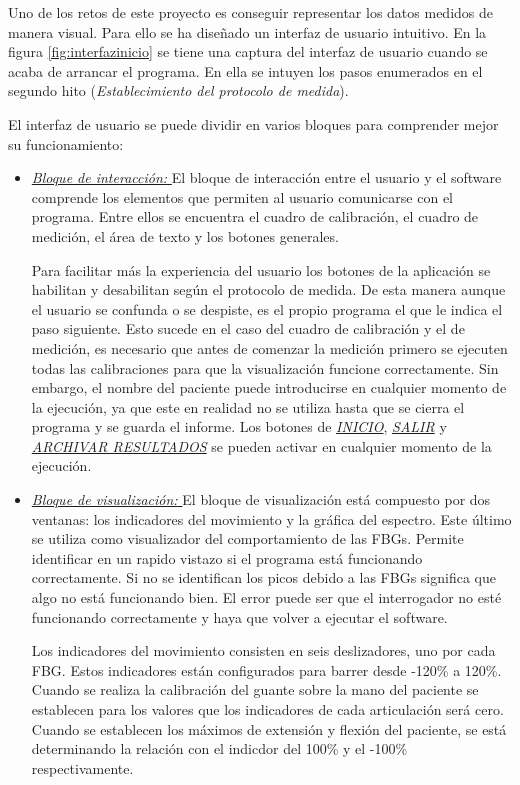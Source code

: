 \begin{itemize} [label=]
	Uno de los retos de este proyecto es conseguir representar los datos medidos de manera visual. Para ello se ha diseñado un interfaz de usuario intuitivo. En la figura \ref{fig:interfazinicio} se tiene una captura del interfaz de usuario cuando se acaba de arrancar el programa. En ella se intuyen los pasos enumerados en el segundo hito (\textit{Establecimiento del protocolo de medida}).
	
	El interfaz de usuario se puede dividir en varios bloques para comprender mejor su funcionamiento:
	
	\begin{itemize} [label=]
		\item \underline{\textit{Bloque de interacción: }} El bloque de interacción entre el usuario y el software comprende los elementos que permiten al usuario comunicarse con el programa. Entre ellos se encuentra el cuadro de calibración, el cuadro de medición, el área de texto y los botones generales. 
		
		Para facilitar más la experiencia del usuario los botones de la aplicación se habilitan y desabilitan según el protocolo de medida. De esta manera aunque el usuario se confunda o se despiste, es el propio programa el que le indica el paso siguiente. Esto sucede en el caso del cuadro de calibración y el de medición, es necesario que antes de comenzar la medición primero se ejecuten todas las calibraciones para que la visualización funcione correctamente. Sin embargo, el nombre del paciente puede introducirse en cualquier momento de la ejecución, ya que este en realidad no se utiliza hasta que se cierra el programa y se guarda el informe. Los botones de \underline{\textit{INICIO}}, \underline{\textit{SALIR}} y \underline{\textit{ARCHIVAR RESULTADOS}} se pueden activar en cualquier momento de la ejecución.
		
		\item \underline{\textit{Bloque de visualización: }} El bloque de visualización está compuesto por dos ventanas: los indicadores del movimiento y la gráfica del espectro. Este último se utiliza como visualizador del comportamiento de las FBGs. Permite identificar en un rapido vistazo si el programa está funcionando correctamente. Si no se identifican los picos debido a las FBGs significa que algo no está funcionando bien. El error puede ser que el interrogador no esté funcionando correctamente y haya que volver a ejecutar el software. 
		
		Los indicadores del movimiento consisten en seis deslizadores, uno por cada FBG. Estos indicadores están configurados para barrer desde -120\% a 120\%. Cuando se realiza la calibración del guante sobre la mano del paciente se establecen para los valores que los indicadores de cada articulación será cero. Cuando se establecen los máximos de extensión y flexión del paciente, se está determinando la relación con el indicdor del 100\% y el -100\% respectivamente.
		

\end{itemize}
\end{itemize}

